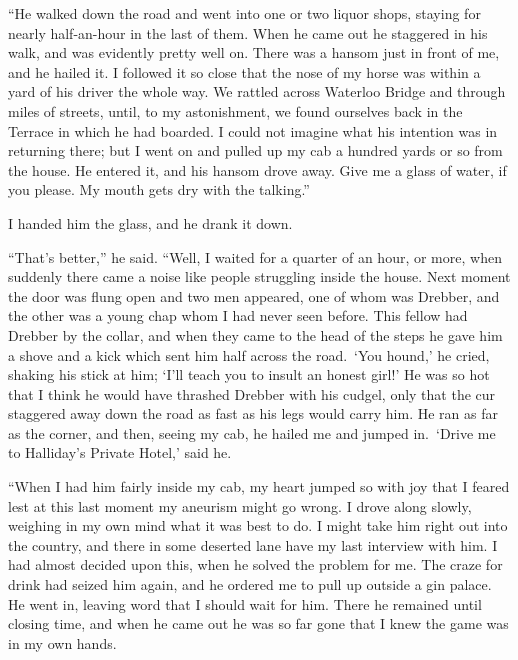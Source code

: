 \documentclass[12pt,english]{book}
\begin{document}
{}``He walked down the road and went into one or two liquor shops,
staying for nearly half-an-hour in the last of them. When he came
out he staggered in his walk, and was evidently pretty well on. There
was a hansom just in front of me, and he hailed it. I followed it
so close that the nose of my horse was within a yard of his driver
the whole way. We rattled across Waterloo Bridge and through miles
of streets, until, to my astonishment, we found ourselves back in
the Terrace in which he had boarded. I could not imagine what his
intention was in returning there; but I went on and pulled up my cab
a hundred yards or so from the house. He entered it, and his hansom
drove away. Give me a glass of water, if you please. My mouth gets
dry with the talking.''

I handed him the glass, and he drank it down.

{}``That's better,'' he said. {}``Well, I waited for a quarter
of an hour, or more, when suddenly there came a noise like people
struggling inside the house. Next moment the door was flung open and
two men appeared, one of whom was Drebber, and the other was a young
chap whom I had never seen before. This fellow had Drebber by the
collar, and when they came to the head of the steps he gave him a
shove and a kick which sent him half across the road.\  `You hound,'
he cried, shaking his stick at him; `I'll teach you to insult an honest
girl!' He was so hot that I think he would have thrashed Drebber with
his cudgel, only that the cur staggered away down the road as fast
as his legs would carry him. He ran as far as the corner, and then,
seeing my cab, he hailed me and jumped in.\  `Drive me to Halliday's
Private Hotel,' said he.

{}``When I had him fairly inside my cab, my heart jumped so with
joy that I feared lest at this last moment my aneurism might go wrong.
I drove along slowly, weighing in my own mind what it was best to
do. I might take him right out into the country, and there in some
deserted lane have my last interview with him. I had almost decided
upon this, when he solved the problem for me. The craze for drink
had seized him again, and he ordered me to pull up outside a gin palace.
He went in, leaving word that I should wait for him. There he remained
until closing time, and when he came out he was so far gone that I
knew the game was in my own hands.
\end{document}
